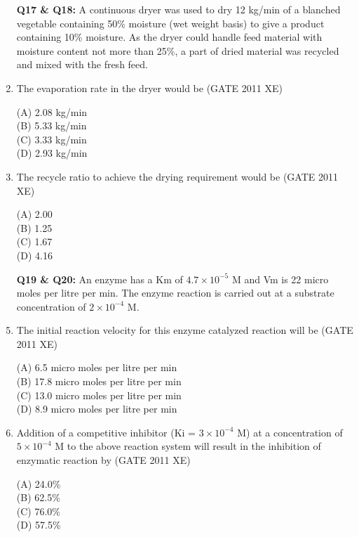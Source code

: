 \documentclass[journal,12pt,onecolumn]{IEEEtran}
\begin{document}
\begin{enumerate}
\item[\textbf{Q17 \& Q18:}] A continuous dryer was used to dry 12 kg/min of a blanched vegetable containing 50\% moisture (wet weight basis) to give a product containing 10\% moisture. As the dryer could handle feed material with moisture content not more than 25\%, a part of dried material was recycled and mixed with the fresh feed.\\

 \item The evaporation rate in the dryer would be
\hfill{(GATE 2011 XE)} \\
\begin{multicols}{2}
(A) 2.08 kg/min \\
(B) 5.33 kg/min \\
(C) 3.33 kg/min \\
(D) 2.93 kg/min
\end{multicols}

\item The recycle ratio to achieve the drying requirement would be
\hfill{(GATE 2011 XE)} \\
\begin{multicols}{2}
(A) 2.00 \\
(B) 1.25 \\
(C) 1.67 \\
(D) 4.16
\end{multicols}

\item[\textbf{Q19 \& Q20:}] An enzyme has a Km of \(4.7 \times 10^{-5}\) M and Vm is 22 micro moles per litre per min. The enzyme reaction is carried out at a substrate concentration of \(2 \times 10^{-4}\) M.\\

\item The initial reaction velocity for this enzyme catalyzed reaction will be
\hfill{(GATE 2011 XE)} \\
\begin{multicols}{2}
(A) 6.5 micro moles per litre per min \\
(B) 17.8 micro moles per litre per min \\
(C) 13.0 micro moles per litre per min \\
(D) 8.9 micro moles per litre per min
\end{multicols}

\newpage 

\item Addition of a competitive inhibitor (Ki = $3 \times 10^{-4}$ M) at a concentration of $5 \times 10^{-4}$ M to the above reaction system will result in the inhibition of enzymatic reaction by
\hfill{(GATE 2011 XE)} \\
\begin{multicols}{2}
(A) 24.0\% \\
(B) 62.5\% \\
(C) 76.0\% \\
(D) 57.5\%
\end{multicols}


\end{enumerate}
\end{document}
